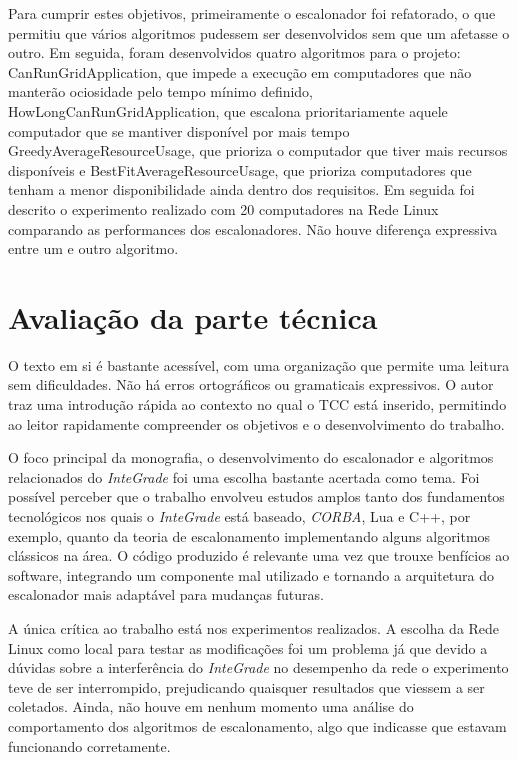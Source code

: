 \documentclass{article}
\begin{document}
	Para cumprir estes objetivos, primeiramente o escalonador foi refatorado, o que permitiu que vários algoritmos pudessem ser desenvolvidos sem que um afetasse o outro. Em seguida, foram desenvolvidos quatro algoritmos para o projeto: CanRunGridApplication, que impede a execução em computadores que não manterão ociosidade pelo tempo mínimo definido,  HowLongCanRunGridApplication, que escalona prioritariamente aquele computador que se mantiver disponível por mais tempo  GreedyAverageResourceUsage, que prioriza o computador que tiver mais recursos disponíveis e BestFitAverageResourceUsage, que prioriza computadores que tenham a menor disponibilidade ainda dentro dos requisitos. Em seguida foi descrito o experimento realizado com 20 computadores na Rede Linux comparando as performances dos escalonadores. Não houve diferença expressiva entre um e outro algoritmo.
	
	
\section{Avaliação da parte técnica}
	O texto em si é bastante acessível, com uma organização que permite uma leitura sem dificuldades. Não há erros ortográficos ou gramaticais expressivos. O autor traz uma introdução rápida ao contexto no qual o TCC está inserido, permitindo ao leitor rapidamente compreender os objetivos e o desenvolvimento do trabalho.
	
	O foco principal da monografia, o desenvolvimento do escalonador e algoritmos relacionados do \emph{InteGrade} foi uma escolha bastante acertada como tema. Foi possível perceber que o trabalho envolveu estudos amplos tanto dos fundamentos tecnológicos nos quais o \emph{InteGrade} está baseado, \emph{CORBA}, Lua e C++, por exemplo, quanto da teoria de escalonamento implementando alguns algoritmos clássicos na área. O código produzido é relevante uma vez que trouxe benfícios ao software, integrando um componente mal utilizado e tornando a arquitetura do escalonador mais adaptável para mudanças futuras.
	
	A única crítica ao trabalho está nos experimentos realizados. A escolha da Rede Linux como local para testar as modificações foi um problema já que devido a dúvidas sobre a interferência do \emph{InteGrade} no desempenho da rede o experimento teve de ser interrompido, prejudicando quaisquer resultados que viessem a ser coletados. Ainda, não houve em nenhum momento uma análise do comportamento dos algoritmos de escalonamento, algo que indicasse que estavam funcionando corretamente.
	
\end{document}
